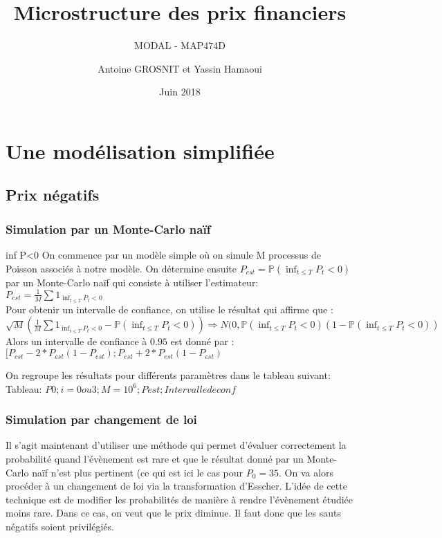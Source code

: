 \documentclass[a4paper,11pt]{article}
\title{Microstructure des prix financiers}
\author{Antoine GROSNIT et Yassin Hamaoui}
\subtitle{MODAL - MAP474D}
\date{Juin 2018}
\begin{document}
\maketitle
\section{Une modélisation simplifiée}

\subsection{Prix négatifs}

\subsubsection{Simulation par un Monte-Carlo naïf}

inf P<0
On commence par un modèle simple où on simule M processus de Poisson associés à notre modèle. On détermine ensuite $P_{est}=\mathbb{P}(\inf_{t\leq T} P_{t}< 0)$ par un Monte-Carlo naïf qui consiste à utiliser l'estimateur: $P_{est}=\frac{1}{M}\sum 1_{ \inf_{t\leq T} P_{t}< 0}$ \\

Pour obtenir un intervalle de confiance, on utilise le résultat qui affirme que : 
$\sqrt{M}(\frac{1}{M}\sum 1_{ \inf_{t\leq T} P_{t}< 0}-\mathbb{P}(\inf_{t\leq T} P_{t}< 0)) \Rightarrow N(0,\mathbb{P}(\inf_{t\leq T} P_{t}< 0)(1-\mathbb{P}(\inf_{t\leq T} P_{t}< 0))$ \\

Alors un intervalle de confiance à $0.95$ est donné par : $[P_{est}-2*P_{est}(1-P_{est});P_{est}+2*P_{est}(1-P_{est})$ 


On regroupe les résultats pour différents paramètres dans le tableau suivant: \\
Tableau: $P0; i=0 ou 3 ;M=10^6; Pest; Intervalle de conf$



\subsubsection{Simulation par changement de loi}

Il s'agit maintenant d'utiliser une méthode qui permet d'évaluer correctement la probabilité quand l'évènement est rare et que le résultat donné par un Monte-Carlo naïf n'est plus pertinent (ce qui est ici le cas pour $P_{0}=35$. On va alors procéder à un changement de loi via la transformation d'Esscher. L'idée de cette technique est de modifier les probabilités de manière à rendre l'évènement étudiée moins rare. Dans ce cas, on veut que le prix diminue. Il faut donc que les sauts négatifs soient privilégiés. 
\end{document}
